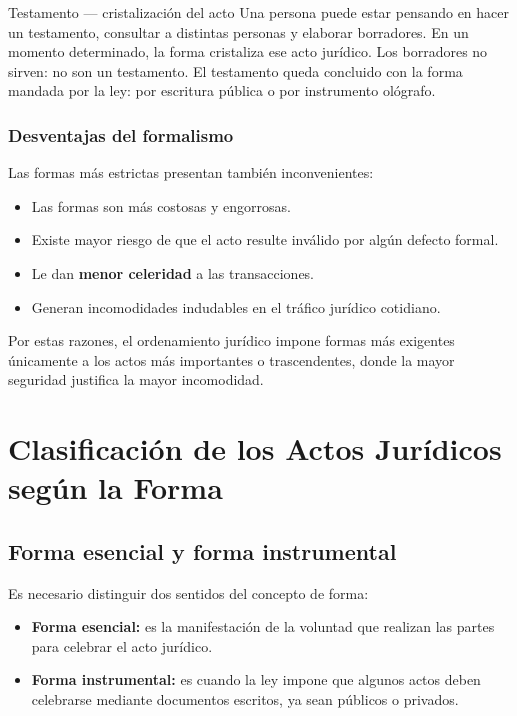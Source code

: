 \documentclass[12pt,oneside]{book}
\begin{document}
\begin{example}{Testamento — cristalización del acto}
Una persona puede estar pensando en hacer un testamento, consultar a distintas personas y elaborar borradores. En un momento determinado, la forma cristaliza ese acto jurídico. Los borradores no sirven: no son un testamento. El testamento queda concluido con la forma mandada por la ley: por escritura pública o por instrumento ológrafo.
\end{example}

\subsection{Desventajas del formalismo}

Las formas más estrictas presentan también inconvenientes:

\begin{itemize}
    \item Las formas son más costosas y engorrosas.
    \item Existe mayor riesgo de que el acto resulte inválido por algún defecto formal.
    \item Le dan \textbf{menor celeridad} a las transacciones.
    \item Generan incomodidades indudables en el tráfico jurídico cotidiano.
\end{itemize}

Por estas razones, el ordenamiento jurídico impone formas más exigentes únicamente a los actos más importantes o trascendentes, donde la mayor seguridad justifica la mayor incomodidad.

\chapter{Clasificación de los Actos Jurídicos según la Forma}

\section{Forma esencial y forma instrumental}

Es necesario distinguir dos sentidos del concepto de forma:

\begin{itemize}
    \item \textbf{Forma esencial:} es la manifestación de la voluntad que realizan las partes para celebrar el acto jurídico.
    \item \textbf{Forma instrumental:} es cuando la ley impone que algunos actos deben celebrarse mediante documentos escritos, ya sean públicos o privados.
\end{itemize}
\end{document}
